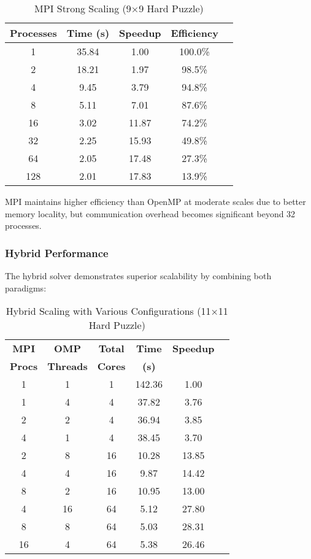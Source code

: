 \documentclass[10pt, conference]{IEEEtran}
\begin{document}
\begin{table}[htbp]
\caption{MPI Strong Scaling (9×9 Hard Puzzle)}
\begin{center}
\begin{tabular}{@{}ccccc@{}}
\toprule
\textbf{Processes} & \textbf{Time (s)} & \textbf{Speedup} & \textbf{Efficiency} \\
\midrule
1 & 35.84 & 1.00 & 100.0\% \\
2 & 18.21 & 1.97 & 98.5\% \\
4 & 9.45 & 3.79 & 94.8\% \\
8 & 5.11 & 7.01 & 87.6\% \\
16 & 3.02 & 11.87 & 74.2\% \\
32 & 2.25 & 15.93 & 49.8\% \\
64 & 2.05 & 17.48 & 27.3\% \\
128 & 2.01 & 17.83 & 13.9\% \\
\bottomrule
\end{tabular}
\end{center}
\label{tab:mpi_scaling}
\end{table}

MPI maintains higher efficiency than OpenMP at moderate scales due to better memory locality, but communication overhead becomes significant beyond 32 processes.

\subsubsection{Hybrid Performance}
The hybrid solver demonstrates superior scalability by combining both paradigms:

\begin{table}[htbp]
\caption{Hybrid Scaling with Various Configurations (11×11 Hard Puzzle)}
\begin{center}
\begin{tabular}{@{}cccccc@{}}
\toprule
\textbf{MPI} & \textbf{OMP} & \textbf{Total} & \textbf{Time} & \textbf{Speedup} \\
\textbf{Procs} & \textbf{Threads} & \textbf{Cores} & \textbf{(s)} & \\
\midrule
1 & 1 & 1 & 142.36 & 1.00 \\
1 & 4 & 4 & 37.82 & 3.76 \\
2 & 2 & 4 & 36.94 & 3.85 \\
4 & 1 & 4 & 38.45 & 3.70 \\
2 & 8 & 16 & 10.28 & 13.85 \\
4 & 4 & 16 & 9.87 & 14.42 \\
8 & 2 & 16 & 10.95 & 13.00 \\
4 & 16 & 64 & 5.12 & 27.80 \\
8 & 8 & 64 & 5.03 & 28.31 \\
16 & 4 & 64 & 5.38 & 26.46 \\
\bottomrule
\end{tabular}
\end{center}
\label{tab:hybrid_scaling}
\end{table}
\end{document}
